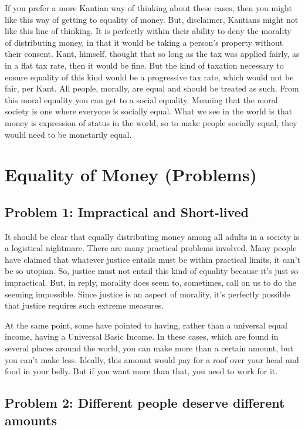 If you prefer a more Kantian way of thinking about these cases, then you might like this way of getting to equality of money. But, disclaimer, Kantians might not like this line of thinking. It is perfectly within their ability to deny the morality of distributing money, in that it would be taking a person's property without their consent. Kant, himself, thought that so long as the tax was applied fairly, as in a flat tax rate, then it would be fine. But the kind of taxation necessary to ensure equality of this kind would be a progressive tax rate, which would not be fair, per Kant. All people, morally, are equal and should be treated as such. From this moral equality you can get to a social equality. Meaning that the moral society is one where everyone is socially equal. What we see in the world is that money is expression of status in the world, so to make people socially equal, they would need to be monetarily equal.

\section{Equality of Money (Problems)}
\subsection{Problem 1: Impractical and Short-lived}

It should be clear that equally distributing money among all adults in a society is a logistical nightmare. There are many practical problems involved. Many people have claimed that whatever justice entails must be within practical limits, it can't be so utopian. So, justice must not entail this kind of equality because it's just so impractical. But, in reply, morality does seem to, sometimes, call on us to do the seeming impossible. Since justice is an aspect of morality, it's perfectly possible that justice requires such extreme measures.

At the same point, some have pointed to having, rather than a universal equal income, having a Universal Basic Income. In these cases, which are found in several places around the world, you can make more than a certain amount, but you can't make less. Ideally, this amount would pay for a roof over your head and food in your belly. But if you want more than that, you need to work for it.
\subsection{Problem 2: Different people deserve different amounts}

